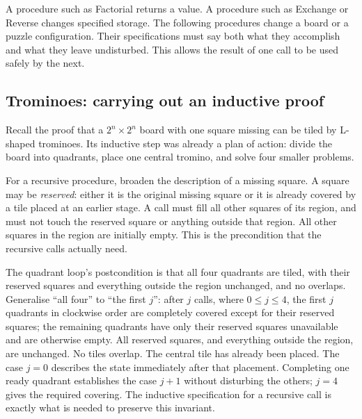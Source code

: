 A procedure such as Factorial returns a value. A procedure such as Exchange
or Reverse changes specified storage. The following procedures change a
board or a puzzle configuration. Their specifications must say both what
they accomplish and what they leave undisturbed. This allows the result
of one call to be used safely by the next.

\subsection{Trominoes: carrying out an inductive proof}

Recall the proof that a $2^n\times2^n$ board with one square missing can be
tiled by L-shaped trominoes. Its inductive step was already a plan of
action: divide the board into quadrants, place one central tromino, and
solve four smaller problems.

For a recursive procedure, broaden the description of a missing square.
A square may be \emph{reserved}: either it is the original missing square
or it is already covered by a tile placed at an earlier stage.
A call must fill all other squares of its region, and must not touch the
reserved square or anything outside that region. All other squares in
the region are initially empty. This is the precondition that the recursive
calls actually need.

The quadrant loop's postcondition is that all four quadrants are tiled,
with their reserved squares and everything outside the region unchanged,
and no overlaps. Generalise ``all four'' to ``the first $j$'': after
$j$ calls, where $0\leq j\leq4$, the first $j$ quadrants in clockwise order
are completely covered except for their reserved squares; the remaining
quadrants have only their reserved squares unavailable and are otherwise
empty. All reserved squares, and everything outside the region, are
unchanged. No tiles overlap. The central tile has already been placed.
The case $j=0$ describes the state immediately after that placement.
Completing one ready quadrant establishes the case $j+1$ without disturbing
the others; $j=4$ gives the required covering. The inductive specification
for a recursive call is exactly what is needed to preserve this invariant.

